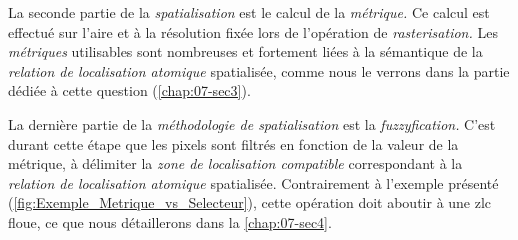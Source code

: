 La seconde partie de la \emph{spatialisation} est le calcul de la \emph{métrique.} Ce calcul est effectué sur l'aire et à la résolution fixée lors de l'opération de \emph{rasterisation.} Les \emph{métriques} utilisables sont nombreuses et fortement liées à la sémantique de la \emph{relation de localisation atomique} spatialisée, comme nous le verrons dans la partie dédiée à cette question (\autoref{chap:07-sec3}).

La dernière partie de la \emph{méthodologie de spatialisation} est la \emph{fuzzyfication.} C'est durant cette étape que les pixels sont filtrés en fonction de la valeur de la métrique, à délimiter la \emph{zone de localisation compatible} correspondant à la \emph{relation de localisation atomique} spatialisée. Contrairement à l'exemple présenté (\autoref{fig:Exemple_Metrique_vs_Selecteur}), cette opération doit aboutir à une \ac{zlc} floue, ce que nous détaillerons dans la \autoref{chap:07-sec4}.



